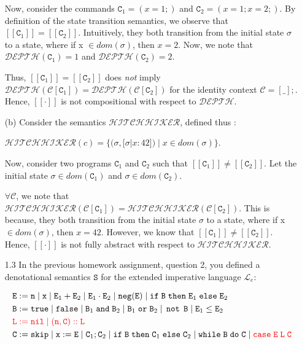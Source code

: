 \documentclass{article}
\newcommand{\E}{\mathtt{E}}
\newcommand{\B}{\mathtt{B}}
\newcommand{\C}{\mathtt{C}}
\newcommand{\LL}{\mathtt{L}}
\newcommand{\true}{\mathtt{true}}
\newcommand{\false}{\mathtt{false}}
\newcommand{\andsym}{\mathtt{and}}
\newcommand{\orsym}{\mathtt{or}}
\newcommand{\notsym}{\mathop{\mathtt{not}}}
\newcommand{\ifsym}{\mathtt{if}}
\newcommand{\then}{\mathtt{then}}
\newcommand{\elsesym}{\mathtt{else}}
\newcommand{\whilesym}{\mathtt{while}}
\newcommand{\dosym}{\mathtt{do}}
\newcommand{\skipsym}{\mathtt{skip}}
\newcommand{\nil}{\mathtt{nil}}
\newcommand{\case}{\mathtt{case}}
\newcommand{\negation}{\mathtt{neg}}
\newcommand{\Sem}{\mathtt{S}}
\newcommand{\question}[1]
{\color{DarkBlue}#1 \color{Black}}
\begin{document}
\begin{enumerate}
	Now, consider the commands $\C_1 = (x = 1;)$ and $\C_2 = (x = 1; x = 2;)$.
	By definition of the state transition semantics, we observe that 
	$[[ \C_1 ]] = [[ \C_2 ]] $. Intuitively, they both transition from the
	initial state $\sigma$  to a state, where if x $\in dom(\sigma)$, then $x = 2$.
	Now, we note that $\mathcal{DEPTH}(\C_1) = 1$ and $\mathcal{DEPTH}(\C_2) = 2$. 
	
	Thus, $[[ \C_1 ]] = [[ \C_2 ]]$ does \textit{not} imply
	$\mathcal{DEPTH}(\mathcal{C}[\C_1]) = \mathcal{DEPTH}(\mathcal{C}[\C_2])$ 
	for the identity context $\mathcal{C} = [\_];$.
	Hence, $[[\cdot]]$ is not compositional with respect to $\mathcal{DEPTH}$.	
 

(b) Consider the semantics $\mathcal{HITCHHIKER}$, defined thus :

	$ \mathcal{HITCHHIKER}(c) = \{ (\sigma, [ \sigma | x : 42 ] ) 
	\; | \; x \in dom (\sigma) \}$.
	
	Now, consider two programs $\C_1$ and $\C_2$ such that 	$[[ \C_1 ]] \neq [[
	\C_2 ]]$. Let the initial state $\sigma \in dom(\C_1)$ and  $\sigma \in
	dom(\C_2)$.
	
	$\forall \mathcal{C}$, we note that $\mathcal{HITCHHIKER}(\mathcal{C}[\C_1]) =
	\mathcal{HITCHHIKER}(\mathcal{C}[\C_2])$.
    This is because, they both transition from the initial state $\sigma$
    to a state, where if x $\in dom(\sigma)$, then $x = 42$.  
    However, we know that $[[ \C_1 ]] \neq [[ \C_2 ]]$.
    Hence, $[[\cdot]]$ is not fully abstract with respect to
    $\mathcal{HITCHHIKER}$.
            
\question{
\item[1.3] In the previous homework assignment, question 2, you defined a denotational 
semantics $\Sem$ for the extended imperative language $\mathcal{L}_e$:

\begin{align*}
& \E := \mathtt{n} \; | \; \mathtt{x} \; | \; \E_1 + \E_2 \; | \; \E_1 \cdot \E_2 \; | \; \negation(\E) \; | \; \ifsym \; \B \; \then \; \E_1 \; \elsesym \; \E_2 \\ 
& \B := \true \; | \; \false \; | \; \B_1 \; \andsym \; \B_2 \; | \; \B_1 \; \orsym \; \B_2 \; | \; \notsym \; \B \; | \; \E_1 \leq \E_2 \\
& {\color{red} \LL := \nil \; | \; (\mathtt{n},\C)::\LL} \\
& \C := \skipsym \; | \; \mathtt{x} := \E \; | \; \C_1 ; \C_2 \; | \; \ifsym \; \B \; \then \; \C_1 \; \elsesym \; \C_2 \; | \; \whilesym \; \B \; \dosym \; \C \; | \; {\color{red} \case \; \E \; \LL \; \C}
\end{align*}

}
\end{enumerate}
\end{document}
